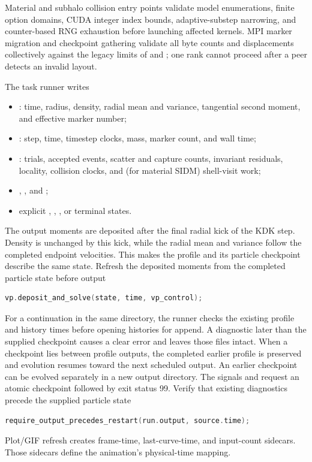 Material and subhalo collision entry points validate model enumerations,
finite option domains, CUDA integer index bounds, adaptive-substep narrowing,
and counter-based RNG exhaustion before launching affected kernels.  MPI
marker migration and checkpoint gathering validate all byte counts and
displacements collectively against the legacy  limits of
 and ; one rank cannot proceed after a
peer detects an invalid layout.

The task runner writes
\begin{itemize}
\item {}: time, radius, density, radial mean and
variance, tangential second moment, and effective marker number;
\item {}: step, time, timestep clocks, mass, marker count,
and wall time;
\item {}: trials, accepted events, scatter and
capture counts, invariant residuals, locality, collision clocks, and (for
material SIDM) shell-visit work;
\item {}, , and
;
\item explicit , ,
, or  terminal states.
\end{itemize}
The output moments are deposited after the final radial kick of the KDK
step. Density is unchanged by this kick, while the radial mean and variance
follow the completed endpoint velocities. This makes the profile and its
particle checkpoint describe the same state.
{}
{Refresh the deposited moments from the completed particle state before output}
\begin{lstlisting}[language=C++]
vp.deposit_and_solve(state, time, vp_control);
\end{lstlisting}
For a continuation in the same directory, the runner checks the existing
profile and history times before opening histories for append. A diagnostic
later than the supplied checkpoint causes a clear error and leaves those
files intact. When a checkpoint lies between profile outputs, the completed
earlier profile is preserved and evolution resumes toward the next scheduled
output. An earlier checkpoint can be evolved separately in a new output
directory. The signals  and  request an atomic
checkpoint followed by exit status 99.
{}
{Verify that existing diagnostics precede the supplied particle state}
\begin{lstlisting}[language=C++]
require_output_precedes_restart(run.output, source.time);
\end{lstlisting}
Plot/GIF refresh creates frame-time, last-curve-time, and input-count
sidecars.  Those sidecars define the animation's physical-time mapping.

